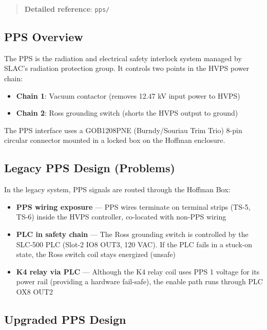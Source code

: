\begin{quote}
\textbf{Detailed reference}: \texttt{pps/}
\end{quote}

\subsection{PPS Overview}\label{pps-overview}

The PPS is the radiation and electrical safety interlock system managed by SLAC's radiation protection group. It controls two points in the HVPS power chain:

\begin{itemize}
\tightlist
\item
  \textbf{Chain 1}: Vacuum contactor (removes 12.47 kV input power to HVPS)
\item
  \textbf{Chain 2}: Ross grounding switch (shorts the HVPS output to ground)
\end{itemize}

The PPS interface uses a GOB1208PNE (Burndy/Souriau Trim Trio) 8-pin circular connector mounted in a locked box on the Hoffman enclosure.

\subsection{Legacy PPS Design (Problems)}\label{legacy-pps-design-problems}

In the legacy system, PPS signals are routed through the Hoffman Box:

\begin{itemize}
\tightlist
\item
  \textbf{PPS wiring exposure} --- PPS wires terminate on terminal strips (TS-5, TS-6) inside the HVPS controller, co-located with non-PPS wiring
\item
  \textbf{PLC in safety chain} --- The Ross grounding switch is controlled by the SLC-500 PLC (Slot-2 IO8 OUT3, 120 VAC). If the PLC fails in a stuck-on state, the Ross switch coil stays energized (unsafe)
\item
  \textbf{K4 relay via PLC} --- Although the K4 relay coil uses PPS 1 voltage for its power rail (providing a hardware fail-safe), the enable path runs through PLC OX8 OUT2
\end{itemize}

\subsection{Upgraded PPS Design}\label{upgraded-pps-design}

